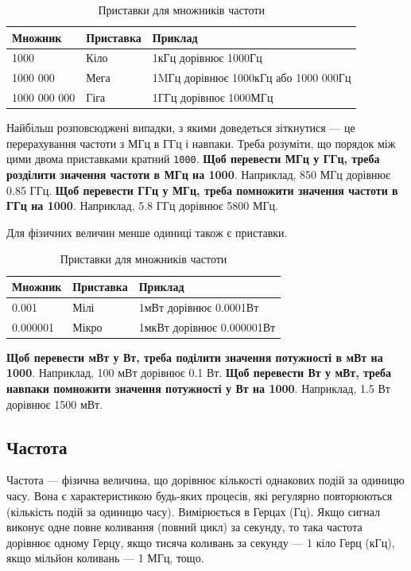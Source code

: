 \documentclass{article}
\begin{document}
\begin{table}[ht]
\centering
\begin{tabular}{|l|l|l|}
\hline
\textbf{Множник} & \textbf{Приставка}  & \textbf{Приклад} \\
\hline
1000           & Кіло   & 1кГц дорівнює 1000Гц \\
1000 000       & Мега   & 1MГц дорівнює 1000кГц або 1000 000Гц \\
1000 000 000   & Гіга   & 1ГГц дорівнює 1000МГц \\
\hline
\end{tabular}
\caption{Приставки для множників частоти}
\end{table}

Найбільш розповсюджені випадки, з якими доведеться зіткнутися --- це перерахування частоти з МГц в ГГц і навпаки. Треба розуміти, що порядок між цими двома приставками кратний \texttt{1000}. \textbf{Щоб перевести МГц у ГГц, треба розділити значення частоти в МГц на 1000}. Наприклад, 850 МГц дорівнює 0.85 ГГц. \textbf{Щоб перевести ГГц у МГц, треба помножити значення частоти в ГГц на 1000}. Наприклад, 5.8 ГГц дорівнює 5800 МГц.

Для фізичних величин менше одиниці також є приставки.

\begin{table}[ht]
\centering
\begin{tabular}{|l|l|l|}
\hline
\textbf{Множник} & \textbf{Приставка}  & \textbf{Приклад} \\
\hline
0.001           & Мілі   & 1мВт дорівнює 0.0001Вт \\
0.000001        & Мікро  & 1мкВт дорівнює 0.000001Вт \\
\hline
\end{tabular}
\caption{Приставки для множників частоти}
\end{table}

\textbf{Щоб перевести мВт у Вт, треба поділити значення потужності в мВт на 1000}. Наприклад, 100 мВт дорівнює 0.1 Вт. \textbf{Щоб перевести Вт у мВт, треба навпаки помножити значення потужності у Вт на 1000}. Наприклад, 1.5 Вт дорівнює 1500 мВт.

\subsection{Частота}
Частота --- фізична величина, що дорівнює кількості однакових подій за одиницю часу. Вона є характеристикою будь-яких процесів, які регулярно повторюються (кількість подій за одиницю часу). Вимірюється в Герцах (Гц). Якщо сигнал виконує одне повне коливання (повний цикл) за секунду, то така частота дорівнює одному Герцу, якщо тисяча коливань за секунду --- 1 кіло Герц (кГц), якщо мільйон коливань --- 1 МГц, тощо.
\end{document}
